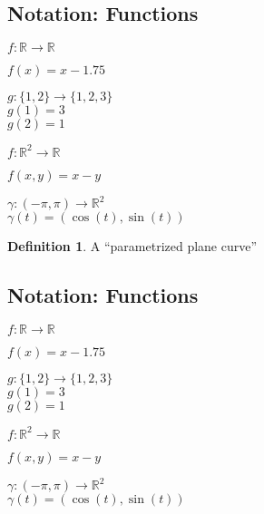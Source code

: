 \documentclass[twocolumn,20pt,fleqn]{extarticle}
\newcommand{\sep}{\vspace{0.5cm}}
\theoremstyle{plain}
\theoremstyle{definition}
\newtheorem*{definition}{Definition}
\theoremstyle{remark}
\begin{document}
\clearpage




\subsection{Notation: Functions}

$ f: \mathbb{R}  \to \mathbb{R}$

$f(x) = x - 1.75$\\

\sep

  $g : \{1,2\} \to \{1,2,3\}$\\
    $g(1) = 3$\\
    $g(2) = 1$\\

\sep

$ f: \mathbb{R}^2  \to \mathbb{R}$

$f(  x,y  ) = x - y$


\sep

$\gamma :  (-\pi,\pi)  \to \mathbb{R}^2$\\
$\gamma(t) = (\cos(t), \sin(t))$



\newpage



\begin{definition}
  A  ``parametrized plane curve'' \end{definition}


\clearpage




\subsection{Notation: Functions}

$ f: \mathbb{R}  \to \mathbb{R}$

$f(x) = x - 1.75$\\

\sep

  $g : \{1,2\} \to \{1,2,3\}$\\
    $g(1) = 3$\\
    $g(2) = 1$\\

\sep

$ f: \mathbb{R}^2  \to \mathbb{R}$

$f(  x,y  ) = x - y$


\sep

$\gamma :  (-\pi,\pi)  \to \mathbb{R}^2$\\
$\gamma(t) = (\cos(t), \sin(t))$
\end{document}
